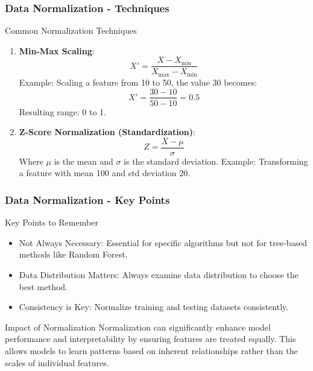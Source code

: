 \documentclass[aspectratio=169]{beamer}
\begin{document}
\begin{frame}[fragile]
    \frametitle{Data Normalization - Techniques}
    \begin{block}{Common Normalization Techniques}
        \begin{enumerate}
            \item \textbf{Min-Max Scaling}:
                \begin{equation}
                X' = \frac{X - X_{\text{min}}}{X_{\text{max}} - X_{\text{min}}}
                \end{equation}
                Example: Scaling a feature from 10 to 50, the value 30 becomes:
                \[
                X' = \frac{30 - 10}{50 - 10} = 0.5
                \]
                Resulting range: 0 to 1.
            
            \item \textbf{Z-Score Normalization (Standardization)}:
                \begin{equation}
                Z = \frac{X - \mu}{\sigma}
                \end{equation}
                Where \( \mu \) is the mean and \( \sigma \) is the standard deviation.
                Example: Transforming a feature with mean 100 and std deviation 20.
        \end{enumerate}
    \end{block}
\end{frame}

\begin{frame}[fragile]
    \frametitle{Data Normalization - Key Points}
    \begin{block}{Key Points to Remember}
        \begin{itemize}
            \item Not Always Necessary: Essential for specific algorithms but not for tree-based methods like Random Forest.
            \item Data Distribution Matters: Always examine data distribution to choose the best method.
            \item Consistency is Key: Normalize training and testing datasets consistently.
        \end{itemize}
    \end{block}
    
    \begin{block}{Impact of Normalization}
        Normalization can significantly enhance model performance and interpretability by ensuring features are treated equally.
        This allows models to learn patterns based on inherent relationships rather than the scales of individual features.
    \end{block}
\end{frame}
\end{document}
